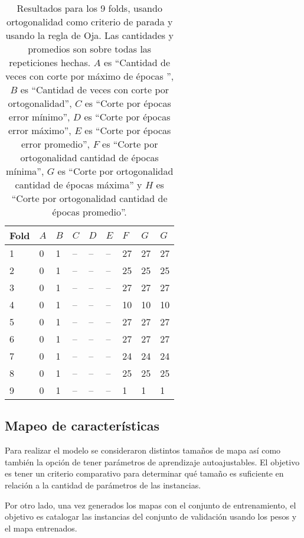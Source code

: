 \documentclass[informe.tex]{subfiles}
\begin{document}
      
      \begin{table}[h]
	\centering
	\begin{tabular}{|l|l|l|l|l|l|l|l|l|} \hline
	Fold & $A$ & $B$ & $C$ & $D$ & $E$ & $F$ & $G$ & $G$ \\ \hline
	1& 0 & 1 & -- & -- & -- & 27 & 27 & 27 \\ \hline
	2& 0 & 1 & -- & -- & -- & 25 & 25 & 25 \\ \hline
	3& 0 & 1 & -- & -- & -- & 27 & 27 & 27 \\ \hline
	4& 0 & 1 & -- & -- & -- & 10 & 10 & 10 \\ \hline
	5& 0 & 1 & -- & -- & -- & 27 & 27 & 27 \\ \hline
	6& 0 & 1 & -- & -- & -- & 27 & 27 & 27 \\ \hline
	7& 0 & 1 & -- & -- & -- & 24 & 24 & 24 \\ \hline
	8& 0 & 1 & -- & -- & -- & 25 & 25 & 25 \\ \hline
	9& 0 & 1 & -- & -- & -- & 1 & 1 & 1 \\ \hline
	\end{tabular}
	\caption{Resultados para los 9 folds, usando ortogonalidad como criterio de parada y usando la regla de Oja. Las cantidades y promedios son sobre todas las repeticiones hechas. $A$ es ``Cantidad de veces con corte por máximo de épocas '', $B$ es ``Cantidad de veces con corte por ortogonalidad'', $C$ es ``Corte por épocas error mínimo'', $D$ es ``Corte por épocas error máximo'', $E$ es ``Corte por épocas error promedio'', $F$ es ``Corte por ortogonalidad cantidad de épocas mínima'', $G$ es ``Corte por ortogonalidad cantidad de épocas máxima'' y $H$ es ``Corte por ortogonalidad cantidad de épocas promedio''. }
	\label{tab:ortogonalidad_oja}
      \end{table}

      
      
    \subsection{Mapeo de características}
      Para realizar el modelo se consideraron distintos tamaños de mapa así como también la opción de tener parámetros de aprendizaje autoajustables. El objetivo es tener un criterio comparativo para determinar qué tamaño es suficiente en relación a la cantidad de parámetros de las instancias.
      
      Por otro lado, una vez generados los mapas con el conjunto de entrenamiento, el objetivo es catalogar las instancias del conjunto de validación usando los pesos y el mapa entrenados. 
      
\end{document}
